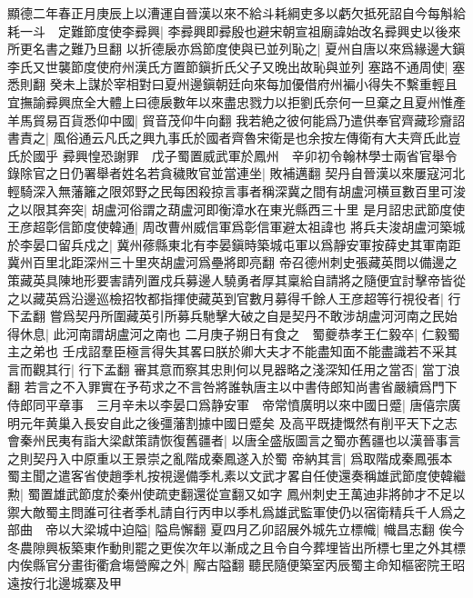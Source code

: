 顯德二年春正月庚辰上以漕運自晉漢以來不給斗耗綱吏多以虧欠抵死詔自今每斛給耗一斗　定難節度使李彛興|{
	李彛興即彛殷也避宋朝宣祖廟諱始改名彛興史以後來所更名書之難乃旦翻}
以折德扆亦爲節度使與已並列恥之|{
	夏州自唐以來爲緣邊大鎭李氏又世襲節度使府州漢氏方置節鎭折氏父子又晚出故恥與並列}
塞路不通周使|{
	塞悉則翻}
癸未上謀於宰相對曰夏州邊鎭朝廷向來每加優借府州褊小得失不繫重輕且宜撫諭彛興庶全大體上曰德扆數年以來盡忠戮力以拒劉氏奈何一旦棄之且夏州惟產羊馬貿易百貨悉仰中國|{
	貿音茂仰牛向翻}
我若絶之彼何能爲乃遣供奉官齊藏珍齎詔書責之|{
	風俗通云凡氏之興九事氏於國者齊魯宋衛是也余按左傳衛有大夫齊氏此豈氏於國乎}
彛興惶恐謝罪　戊子蜀置威武軍於鳳州　辛卯初令翰林學士兩省官舉令錄除官之日仍署舉者姓名若貪穢敗官並當連坐|{
	敗補邁翻}
契丹自晉漢以來屢寇河北輕騎深入無藩籬之限郊野之民每困殺掠言事者稱深冀之間有胡盧河横亘數百里可浚之以限其奔突|{
	胡盧河俗謂之葫盧河即衡漳水在東光縣西三十里}
是月詔忠武節度使王彦超彰信節度使韓通|{
	周改曹州威信軍爲彰信軍避太祖諱也}
將兵夫浚胡盧河築城於李晏口留兵戍之|{
	冀州蓚縣東北有李晏鎭時築城屯軍以爲靜安軍按薛史其軍南距冀州百里北距深州三十里夾胡盧河爲壘將即亮翻}
帝召德州刺史張藏英問以備邊之策藏英具陳地形要害請列置戍兵募邊人驍勇者厚其稟給自請將之隨便宜討擊帝皆從之以藏英爲沿邊巡檢招牧都指揮使藏英到官數月募得千餘人王彦超等行視役者|{
	行下孟翻}
嘗爲契丹所圍藏英引所募兵馳擊大破之自是契丹不敢涉胡盧河河南之民始得休息|{
	此河南謂胡盧河之南也}
二月庚子朔日有食之　蜀夔恭孝王仁毅卒|{
	仁毅蜀主之弟也}
壬戌詔羣臣極言得失其畧曰朕於卿大夫才不能盡知面不能盡識若不采其言而觀其行|{
	行下孟翻}
審其意而察其忠則何以見器略之淺深知任用之當否|{
	當丁浪翻}
若言之不入罪實在予苟求之不言咎將誰執唐主以中書侍郎知尚書省嚴續爲門下侍郎同平章事　三月辛未以李晏口爲静安軍　帝常憤廣明以來中國日蹙|{
	唐僖宗廣明元年黄巢入長安自此之後彊藩割據中國日蹙矣}
及高平既捷慨然有削平天下之志會秦州民夷有詣大梁獻策請恢復舊疆者|{
	以唐全盛版圖言之蜀亦舊疆也以漢晉事言之則契丹入中原重以王景崇之亂階成秦鳳遂入於蜀}
帝納其言|{
	爲取階成秦鳳張本}
蜀主聞之遣客省使趙季札按視邊備季札素以文武才畧自任使還奏稱雄武節度使韓繼勲|{
	蜀置雄武節度於秦州使疏吏翻還從宣翻又如字}
鳳州刺史王萬迪非將帥才不足以禦大敵蜀主問誰可往者季札請自行丙申以季札爲雄武監軍使仍以宿衛精兵千人爲之部曲　帝以大梁城中迫隘|{
	隘烏懈翻}
夏四月乙卯詔展外城先立標幟|{
	幟昌志翻}
俟今冬農隙興板築東作動則罷之更俟次年以漸成之且令自今葬埋皆出所標七里之外其標内俟縣官分畫街衢倉塲營廨之外|{
	廨古隘翻}
聽民隨便築室丙辰蜀主命知樞密院王昭遠按行北邊城寨及甲

